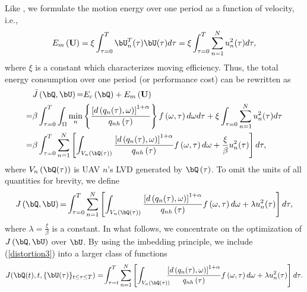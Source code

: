 Like \cite{ML,MLCS}, we formulate the motion energy over one period as a function of velocity, i.e., 
\begin{equation}
E_m\left(\mathbf{U}\right)=\xi\int_{\tau=0}^{T}\bU^T_n(\tau)\bU(\tau)d\tau=\xi\int_{\tau=0}^{T}\sum_{n=1}^{N}u^2_n(\tau)d\tau,
\end{equation}
where $\xi$ is a constant which characterizes moving efficiency. 
Thus, the total energy consumption over one period (or performance cost) can be rewritten as
\begin{equation}
\begin{aligned}
&\bar{J}\left(\bQ,\bU\right) {=} E_c\left(\bQ\right) + E_m\left(\mathbf{U}\right)\\
{=}& \beta\int_{\tau=0}^{T}\int_{\Omega}\min_{n}\left\{\frac{\left[d\left(q_n(\tau),\omega\right)\right]^{1+\alpha}}{q_{nh}\left(\tau\right)}\right\}f\left(\omega,\tau\right)d\omega d\tau + \xi\int_{\tau=0}\sum_{n=1}^{N}u^2_n(\tau)d\tau\\
{=}&\beta\int_{\tau=0}^{T}\sum_{n=1}^{N}\left[\int_{V_n\left(\bQ(\tau)\right)}\frac{\left[d\left(q_n(\tau),\omega\right)\right]^{1+\alpha}}{q_{nh}\left(\tau\right)}f\left(\omega,\tau\right)d\omega + \frac{\xi}{\beta} u^2_n(\tau) \right] d\tau,
\end{aligned}
\label{distortion2}
\end{equation}
where $V_n\left(\bQ(\tau)\right)$ is UAV $n$'s LVD generated by $\bQ\left(\tau\right)$.
To omit the units of all quantities for brevity, we define
\begin{equation}
\begin{aligned}
J\left(\bQ,\bU\right)
{=}\int_{\tau=0}^{T}\sum_{n=1}^{N}\left[\int_{V_n\left(\bQ(\tau)\right)}\frac{\left[d\left(q_n(\tau),\omega\right)\right]^{1+\alpha}}{q_{nh}\left(\tau\right)}f\left(\omega,\tau\right)d\omega + \lambda u^2_n(\tau) \right] d\tau,
\end{aligned}
\label{distortion3}
\end{equation}
where $\lambda=\frac{\xi}{\beta}$ is a constant.
In what follows, we concentrate on the optimization of $J\left(\bQ,\bU\right)$ over $\bU$.
By using the imbedding principle, we include (\ref{distortion3}) into a larger class of functions \cite{KD}
\begin{equation}
J\!\left(\bQ(t), t, \{\bU(\tau)\}_{t\le\tau\le T}\right) =\! \int_{\tau=t}^{T}\sum_{n=1}^{N}\left[\int_{V_n\left(\bQ(\tau)\right)}\!\!\!\!\frac{\left[d\left(q_n(\tau),\omega\right)\right]^{1+\alpha}}{q_{nh}\left(\tau\right)}f\left(\omega,\tau\right)d\omega + \lambda u^2_n(\tau) \right] d\tau.
\label{Jt}
\end{equation}

